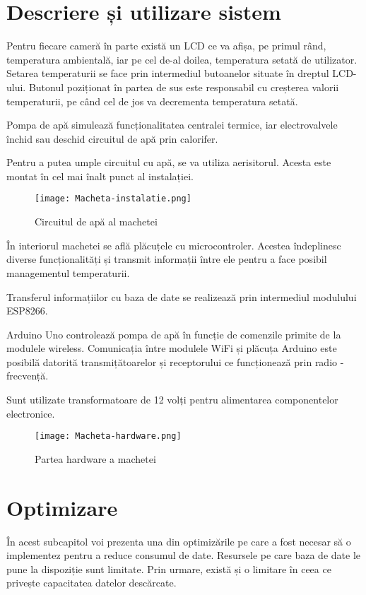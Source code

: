 \section{Descriere și utilizare sistem}

	Pentru fiecare cameră în parte există un LCD ce va afișa, pe primul rând, temperatura ambientală, iar pe cel de-al doilea, temperatura setată de utilizator. Setarea temperaturii se face prin intermediul butoanelor situate în dreptul LCD-ului. Butonul poziționat în partea de sus este responsabil cu creșterea valorii temperaturii, pe când cel de jos va decrementa temperatura setată.

	Pompa de apă simulează funcționalitatea centralei termice, iar electrovalvele închid sau deschid circuitul de apă prin calorifer.
	
	Pentru a putea umple circuitul cu apă, se va utiliza aerisitorul. Acesta este montat în cel mai înalt punct al instalației.  

\begin{figure}[H]
   	\centering
    	\texttt{[image: Macheta-instalatie.png]}
	\caption{Circuitul de apă al machetei}
\end{figure}

	În interiorul machetei se află plăcuțele cu microcontroler. Acestea îndeplinesc diverse funcționalități și transmit informații între ele pentru a face posibil managementul temperaturii. 

	Transferul informațiilor cu baza de date se realizează prin intermediul modulului ESP8266. 
	
	Arduino Uno controlează pompa de apă în funcție de comenzile primite de la modulele wireless. Comunicația între modulele WiFi și plăcuța Arduino este posibilă datorită transmițătoarelor și receptorului ce funcționează prin radio - frecvență.

	Sunt utilizate transformatoare de 12 volți pentru alimentarea componentelor electronice.

\begin{figure}[H]
   	\centering
    	\texttt{[image: Macheta-hardware.png]}
	\caption{Partea hardware a machetei}
\end{figure}



\section{Optimizare}

	În acest subcapitol voi prezenta una din optimizările pe care a fost necesar să o implementez pentru a reduce consumul de date. Resursele pe care baza de date le pune la dispoziție sunt limitate. Prin urmare, există și o limitare în ceea ce privește capacitatea datelor descărcate.

